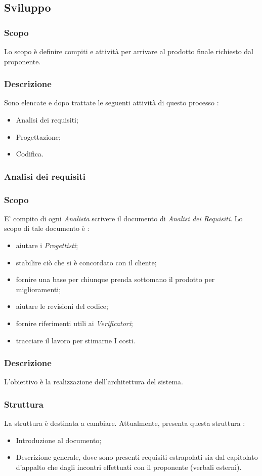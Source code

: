 \subsection{Sviluppo}
\subsubsection{Scopo}
Lo scopo è definire compiti e attività per arrivare al prodotto finale richiesto dal proponente.
\subsubsection{Descrizione}
Sono elencate e dopo trattate le seguenti attività di questo processo :
\begin{itemize}
  \item Analisi dei requisiti;
  \item Progettazione;
  \item Codifica.
\end{itemize}
\subsubsection{Analisi dei requisiti}
\subsubsection{Scopo}
E’ compito di ogni \textit{Analista} scrivere il documento di \textit{Analisi dei Requisiti}. Lo scopo di tale documento è :
\begin{itemize}
  \item aiutare i \textit{Progettisti};
  \item stabilire ciò che si è concordato con il cliente;
  \item fornire una base per chiunque prenda sottomano il prodotto per miglioramenti;
  \item aiutare le revisioni del codice;
  \item fornire riferimenti utili ai \textit{Verificatori};
  \item tracciare il lavoro per stimarne I costi.
\end{itemize}

\subsubsection{Descrizione}
L’obiettivo è la realizzazione dell’architettura del sistema.

\subsubsection{Struttura}
La struttura è destinata a cambiare.
Attualmente, \AdR presenta questa struttura :
\begin{itemize}
  \item Introduzione al documento;
  \item Descrizione generale, dove sono presenti requisiti estrapolati sia dal capitolato d’appalto che dagli incontri effettuati con il proponente (verbali esterni).
\end{itemize}

